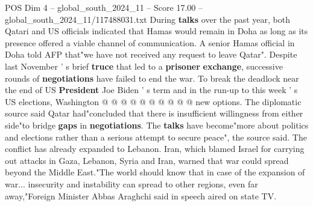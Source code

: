 \begin{textsample}{POS Dim 4 – global\_south\_2024\_11 – Score 17.00 – global\_south\_2024\_11/117488031.txt}
During \textbf{talks} over the past year, both Qatari and US officials indicated that Hamas would remain in Doha as long as its presence offered a viable channel of communication.
A senior Hamas official in Doha told AFP that"we have not received any request to leave Qatar".
Despite last November ' s brief \textbf{truce} that led to a \textbf{prisoner} \textbf{exchange}, successive rounds of \textbf{negotiations} have failed to end the war.
To break the deadlock near the end of US \textbf{President} Joe Biden ' s term and in the run-up to this week ' s US elections, Washington @ @ @ @ @ @ @ @ @ @ new options.
The diplomatic source said Qatar had"concluded that there is insufficient willingness from either side"to bridge \textbf{gaps} in \textbf{negotiations}.
The \textbf{talks} have become"more about politics and elections rather than a serious attempt to secure peace", the source said.
The conflict has already expanded to Lebanon.
Iran, which blamed Israel for carrying out attacks in Gaza, Lebanon, Syria and Iran, warned that war could spread beyond the Middle East."The world should know that in case of the expansion of war... insecurity and instability can spread to other regions, even far away,"Foreign Minister Abbas Araghchi said in speech aired on state TV.

\end{textsample}

